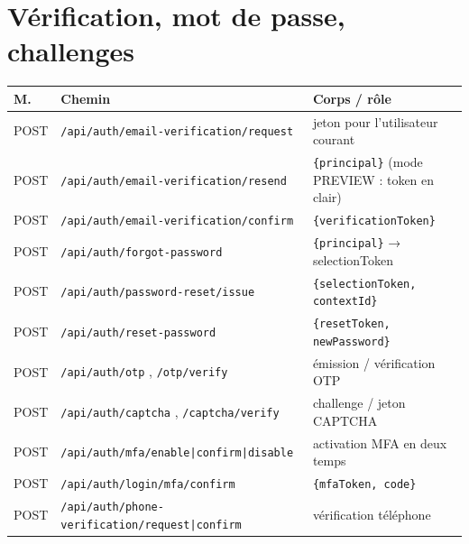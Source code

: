 \documentclass[11pt,a4paper,oneside]{report}
\newcommand{\code}[1]{\texttt{\small #1}}
\begin{document}
\section{Vérification, mot de passe, challenges}
\begin{center}\small
\begin{longtable}{@{}p{1.2cm}p{6.6cm}p{5.5cm}@{}}
\toprule
\textbf{M.} & \textbf{Chemin} & \textbf{Corps / rôle}\\
\midrule\endhead
POST & \code{/api/auth/email-verification/request} & jeton pour l'utilisateur courant\\
POST & \code{/api/auth/email-verification/resend} & \code{\{principal\}} (mode PREVIEW : token en clair)\\
POST & \code{/api/auth/email-verification/confirm} & \code{\{verificationToken\}}\\
POST & \code{/api/auth/forgot-password} & \code{\{principal\}} → selectionToken\\
POST & \code{/api/auth/password-reset/issue} & \code{\{selectionToken, contextId\}}\\
POST & \code{/api/auth/reset-password} & \code{\{resetToken, newPassword\}}\\
POST & \code{/api/auth/otp} , \code{/otp/verify} & émission / vérification OTP\\
POST & \code{/api/auth/captcha} , \code{/captcha/verify} & challenge / jeton CAPTCHA\\
POST & \code{/api/auth/mfa/enable|confirm|disable} & activation MFA en deux temps\\
POST & \code{/api/auth/login/mfa/confirm} & \code{\{mfaToken, code\}}\\
POST & \code{/api/auth/phone-verification/request|confirm} & vérification téléphone\\
\bottomrule
\end{longtable}
\end{center}
\end{document}
